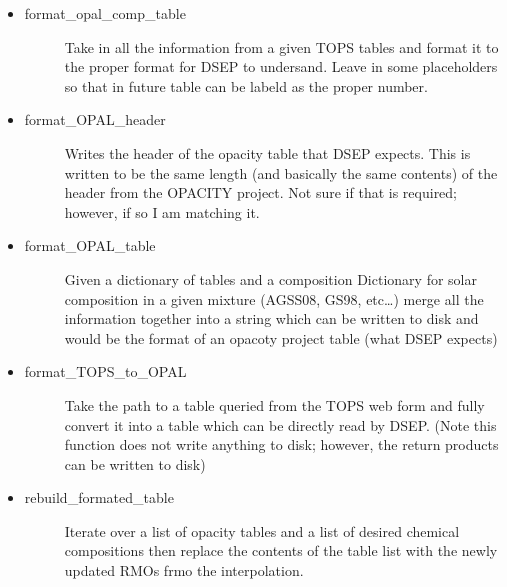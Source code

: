\documentclass[letterpaper,10pt,english]{sphinxmanual}
\begin{document}
\begin{itemize}
\begin{description}
\end{description}

\item {} \begin{description}
\item[{format\_opal\_comp\_table}] \leavevmode
\sphinxAtStartPar
Take in all the information from a given TOPS tables and format it
to the proper format for DSEP to undersand. Leave in some placeholders
so that in future table can be labeld as the proper number.

\end{description}

\item {} \begin{description}
\item[{format\_OPAL\_header}] \leavevmode
\sphinxAtStartPar
Writes the header of the opacity table that DSEP expects. This is written
to be the same length (and basically the same contents) of the header
from the OPACITY project. Not sure if that is required; however, if so
I am matching it.

\end{description}

\item {} \begin{description}
\item[{format\_OPAL\_table}] \leavevmode
\sphinxAtStartPar
Given a dictionary of tables and a composition Dictionary for solar
composition in a given mixture (AGSS08, GS98, etc…) merge all the
information together into a string which can be written to disk and
would be the format of an opacoty project table (what DSEP expects)

\end{description}

\item {} \begin{description}
\item[{format\_TOPS\_to\_OPAL}] \leavevmode
\sphinxAtStartPar
Take the path to a table queried from the TOPS web form and fully convert it
into a table which can be directly read by DSEP. (Note this function
does not write anything to disk; however, the return products can be
written to disk)

\end{description}

\item {} \begin{description}
\item[{rebuild\_formated\_table}] \leavevmode
\sphinxAtStartPar
Iterate over a list of opacity tables and a list of desired chemical
compositions then replace the contents of the table list with the newly
updated RMOs frmo the interpolation.


\end{description}
\end{itemize}
\end{document}
